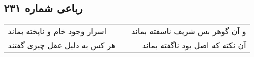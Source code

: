 \begin{center}
\section*{رباعی شماره ۲۳۱}
\label{sec:sh231}
\begin{longtable}{l p{0.5cm} r}
اسرار وجود خام و ناپخته بماند
&&
و آن گوهر بس شریف ناسفته بماند
\\
هر کس به دلیل عقل چیزی گفتند
&&
آن نکته که اصل بود ناگفته بماند
\\
\end{longtable}
\end{center}
